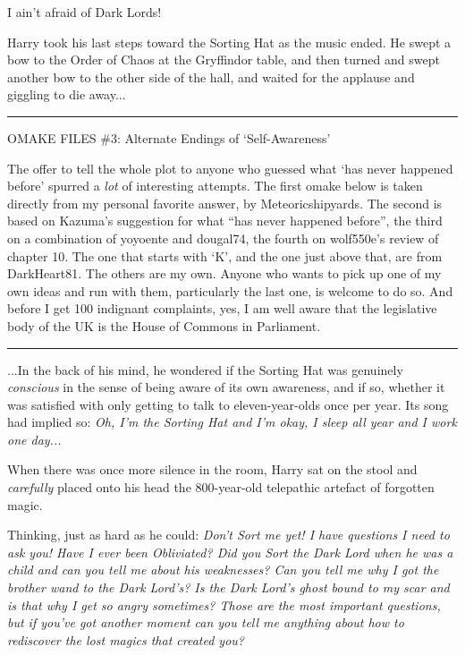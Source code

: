 I ain't afraid of Dark Lords!

Harry took his last steps toward the Sorting Hat as the music ended. He
swept a bow to the Order of Chaos at the Gryffindor table, and then
turned and swept another bow to the other side of the hall, and waited
for the applause and giggling to die away...

\begin{center}\rule{3in}{0.4pt}\end{center}

OMAKE FILES \#3: Alternate Endings of `Self-Awareness'

The offer to tell the whole plot to anyone who guessed what `has never
happened before' spurred a \emph{lot} of interesting attempts. The first
omake below is taken directly from my personal favorite answer, by
Meteoricshipyards. The second is based on Kazuma's suggestion for what
``has never happened before'', the third on a combination of yoyoente
and dougal74, the fourth on wolf550e's review of chapter 10. The one
that starts with `K', and the one just above that, are from DarkHeart81.
The others are my own. Anyone who wants to pick up one of my own ideas
and run with them, particularly the last one, is welcome to do so. And
before I get 100 indignant complaints, yes, I am well aware that the
legislative body of the UK is the House of Commons in Parliament.

\begin{center}\rule{3in}{0.4pt}\end{center}

...In the back of his mind, he wondered if the Sorting Hat was
genuinely \emph{conscious} in the sense of being aware of its own
awareness, and if so, whether it was satisfied with only getting to talk
to eleven-year-olds once per year. Its song had implied so: \emph{Oh,
I'm the Sorting Hat and I'm okay, I sleep all year and I work one
day...}

When there was once more silence in the room, Harry sat on the stool and
\emph{carefully} placed onto his head the 800-year-old telepathic
artefact of forgotten magic.

Thinking, just as hard as he could: \emph{Don't Sort me yet! I have
questions I need to ask you! Have I ever been Obliviated? Did you Sort
the Dark Lord when he was a child and can you tell me about his
weaknesses? Can you tell me why I got the brother wand to the Dark
Lord's? Is the Dark Lord's ghost bound to my scar and is that why I get
so angry sometimes? Those are the most important questions, but if
you've got another moment can you tell me anything about how to
rediscover the lost magics that created you?}

